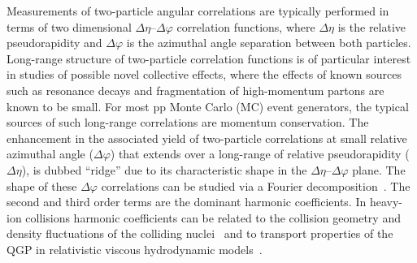Measurements of two-particle angular correlations are typically performed in terms of two dimensional $\Delta\eta$--$\Delta\varphi$ correlation functions, where $\Delta\eta$ is the relative pseudorapidity and $\Delta\varphi$ is the azimuthal angle separation between both particles. Long-range structure of two-particle correlation functions is of particular interest in studies of possible novel collective effects, where the effects of known sources such as resonance decays and fragmentation of high-momentum partons are known to be small. For most pp Monte Carlo (MC) event generators, the typical sources of such long-range correlations are momentum conservation. %
The enhancement in the associated yield of two-particle correlations at small relative azimuthal angle ($\Delta\varphi$) that extends over a long-range of relative pseudorapidity ($\Delta\eta$), is dubbed ``ridge'' due to its characteristic shape in the $\Delta\eta$--$\Delta\varphi$ plane.
The shape of these $\Delta\varphi$ correlations can be studied via a Fourier decomposition~\cite{Poskanzer:1998yz,Voloshin:2008dg}. The second and third order terms are the dominant harmonic coefficients. In heavy-ion collisions harmonic coefficients can be related to the collision geometry and density fluctuations of the colliding nuclei~\cite{Alver:2010gr,Alver:2010dn,ALICE:2011ab} and to transport properties of the QGP in relativistic viscous hydrodynamic models~\cite{Gale:2012rq,Niemi:2015qia,Shen:2014vra,Bernhard:2016tnd,Bernhard2019}.

